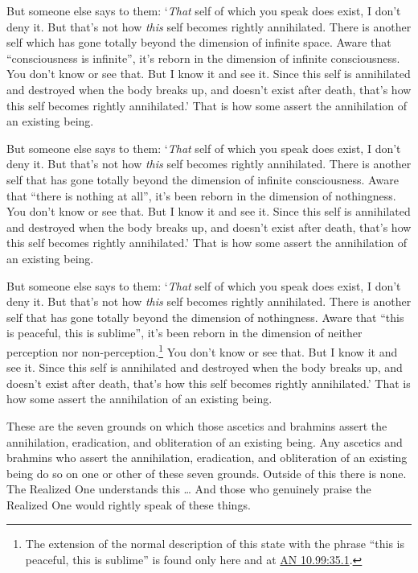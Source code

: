 \documentclass[12pt,openany]{book}%
\begin{document}
But someone else says to them: ‘\emph{That} self of which you speak does exist, I don’t deny it. But that’s not how \emph{this} self becomes rightly annihilated. There is another self which has gone totally beyond the dimension of infinite space. Aware that “consciousness is infinite”, it’s reborn in the dimension of infinite consciousness. You don’t know or see that. But I know it and see it. Since this self is annihilated and destroyed when the body breaks up, and doesn’t exist after death, that’s how this self becomes rightly annihilated.’ That is how some assert the annihilation of an existing being. 

But someone else says to them: ‘\emph{That} self of which you speak does exist, I don’t deny it. But that’s not how \emph{this} self becomes rightly annihilated. There is another self that has gone totally beyond the dimension of infinite consciousness. Aware that “there is nothing at all”, it’s been reborn in the dimension of nothingness. You don’t know or see that. But I know it and see it. Since this self is annihilated and destroyed when the body breaks up, and doesn’t exist after death, that’s how this self becomes rightly annihilated.’ That is how some assert the annihilation of an existing being. 

But someone else says to them: ‘\emph{That} self of which you speak does exist, I don’t deny it. But that’s not how \emph{this} self becomes rightly annihilated. There is another self that has gone totally beyond the dimension of nothingness. Aware that “this is peaceful, this is sublime”, it’s been reborn in the dimension of neither perception nor non-perception.\footnote{The extension of the normal description of this state with the phrase “this is peaceful, this is sublime” is found only here and at \href{https://suttacentral.net/an10.99/en/sujato\#35.1}{AN 10.99:35.1}. } You don’t know or see that. But I know it and see it. Since this self is annihilated and destroyed when the body breaks up, and doesn’t exist after death, that’s how this self becomes rightly annihilated.’ That is how some assert the annihilation of an existing being. 

These are the seven grounds on which those ascetics and brahmins assert the annihilation, eradication, and obliteration of an existing being. Any ascetics and brahmins who assert the annihilation, eradication, and obliteration of an existing being do so on one or other of these seven grounds. Outside of this there is none. The Realized One understands this … And those who genuinely praise the Realized One would rightly speak of these things. 
\end{document}
